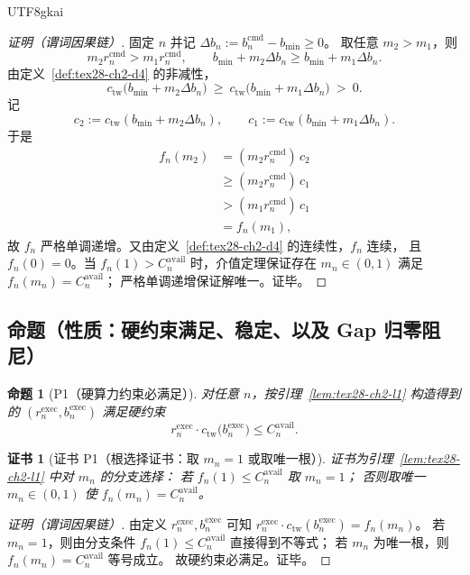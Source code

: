 \documentclass[12pt]{article}
\newtheorem{proposition}{命题}[section]
\newtheorem{Certificate}{证书}[section]
\begin{document}
\begin{CJK*}{UTF8}{gkai}
\begin{proof}[证明（谓词因果链）]
固定 $n$ 并记 $\Delta b_n:=b^{\mathrm{cmd}}_n-b_{\min}\ge 0$。
取任意 $m_2>m_1$，则
\[
  m_2 r^{\mathrm{cmd}}_n > m_1 r^{\mathrm{cmd}}_n,
  \qquad
  b_{\min}+m_2\Delta b_n \ge b_{\min}+m_1\Delta b_n.
\]
由定义~\ref{def:tex28-ch2-d4} 的非减性，
\[
  c_{\mathrm{tw}}\!\bigl(b_{\min}+m_2\Delta b_n\bigr)\ \ge\ c_{\mathrm{tw}}\!\bigl(b_{\min}+m_1\Delta b_n\bigr)\ >\ 0.
\]
记
\[
  c_2:=c_{\mathrm{tw}}(b_{\min}+m_2\Delta b_n),
  \qquad
  c_1:=c_{\mathrm{tw}}(b_{\min}+m_1\Delta b_n).
\]
于是
\[
  \begin{aligned}
    f_n(m_2)
    &= (m_2 r^{\mathrm{cmd}}_n)\,c_2 \\
    &\ge (m_2 r^{\mathrm{cmd}}_n)\,c_1 \\
    &> (m_1 r^{\mathrm{cmd}}_n)\,c_1 \\
    &= f_n(m_1),
  \end{aligned}
\]
故 $f_n$ 严格单调递增。又由定义~\ref{def:tex28-ch2-d4} 的连续性，$f_n$ 连续，
且 $f_n(0)=0$。当 $f_n(1)>C^{\mathrm{avail}}_n$ 时，介值定理保证存在 $m_n\in(0,1)$ 满足 $f_n(m_n)=C^{\mathrm{avail}}_n$；
严格单调递增保证解唯一。证毕。
\end{proof}

\subsection{命题（性质：硬约束满足、稳定、以及 Gap 归零阻尼）}
\label{subsec:tex28-ch2-props}

\begin{proposition}[P1（硬算力约束必满足）]
\label{prop:tex28-ch2-p1}
对任意 $n$，按引理~\ref{lem:tex28-ch2-l1} 构造得到的 $(r^{\mathrm{exec}}_n,b^{\mathrm{exec}}_n)$ 满足硬约束
\[
  r^{\mathrm{exec}}_n\cdot c_{\mathrm{tw}}\bigl(b^{\mathrm{exec}}_n\bigr)\le C^{\mathrm{avail}}_n.
\]
\end{proposition}

\begin{Certificate}[证书 P1（根选择证书：取 $m_n=1$ 或取唯一根）]
\label{cert:tex28-ch2-p1}
证书为引理~\ref{lem:tex28-ch2-l1} 中对 $m_n$ 的分支选择：
若 $f_n(1)\le C^{\mathrm{avail}}_n$ 取 $m_n=1$；
否则取唯一 $m_n\in(0,1)$ 使 $f_n(m_n)=C^{\mathrm{avail}}_n$。
\end{Certificate}

\begin{proof}[证明（谓词因果链）]
由定义 $r^{\mathrm{exec}}_n,b^{\mathrm{exec}}_n$ 可知
$r^{\mathrm{exec}}_n\cdot c_{\mathrm{tw}}(b^{\mathrm{exec}}_n)=f_n(m_n)$。
若 $m_n=1$，则由分支条件 $f_n(1)\le C^{\mathrm{avail}}_n$ 直接得到不等式；
若 $m_n$ 为唯一根，则 $f_n(m_n)=C^{\mathrm{avail}}_n$ 等号成立。
故硬约束必满足。证毕。
\end{proof}


\end{CJK*}
\end{document}
